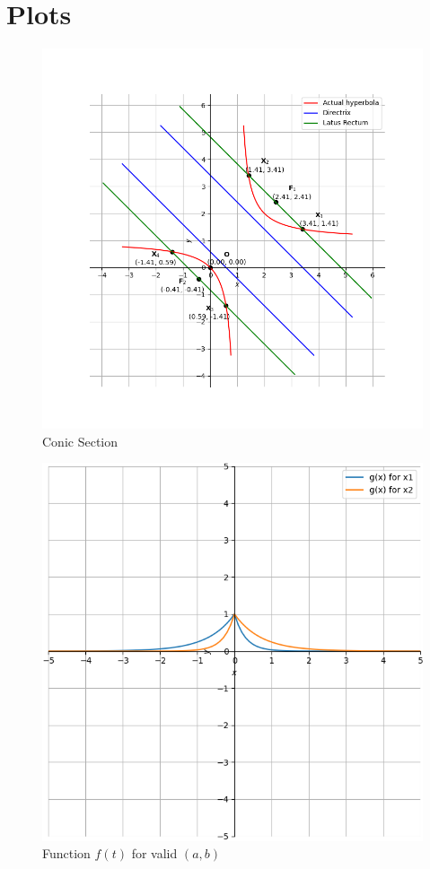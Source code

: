 \documentclass[conference]{IEEEtran}
\theoremstyle{remark}
\begin{document}
	\section{Plots}
	\begin{figure}[H]
		\centering
		\includegraphics[width=1.2\columnwidth]{figs/Hyperbola.png} 
		\caption{Conic Section}
		\label{fig:Hyperbola}
	\end{figure}
	
	\begin{figure}[H]
		\centering
		\includegraphics[width=1\columnwidth]{figs/function.png} 
		\caption{Function $f(t)$ for valid $(a, b)$}
		\label{fig:Function}
	\end{figure}
	
	
	
\end{document}
